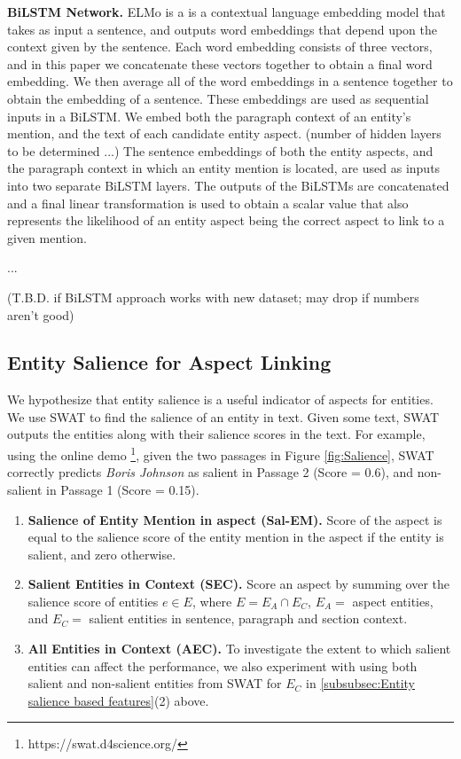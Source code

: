 \textbf{BiLSTM Network. } 
ELMo is a \cite{elmo} is a contextual language embedding model that takes as input a sentence, and outputs word embeddings that depend upon the context given by the sentence. Each word embedding consists of three vectors, and in this paper we concatenate these vectors together to obtain a final word embedding. We then average all of the word embeddings in a sentence together to obtain the embedding of a sentence. These embeddings are used as sequential inputs in a BiLSTM. We embed both the paragraph context of an entity's mention, and the text of each candidate entity aspect. (number of hidden layers to be determined ...)
The sentence embeddings of both the entity aspects, and the paragraph context in which an entity mention is located, are used as inputs into two separate BiLSTM layers. The outputs of the BiLSTMs are concatenated and a final linear transformation is used to obtain a scalar value that also represents the likelihood of an entity aspect being the correct aspect to link to a given mention.
 
...
 
 (T.B.D. if BiLSTM approach works with new dataset; may drop if numbers aren't good)
 


\subsection{Entity Salience for Aspect Linking}
\label{subsec:Entity Salience for Aspect Linking}


We hypothesize that entity salience is a useful indicator of aspects for entities. We use SWAT \cite{swat}  to find the salience of an entity in text. Given some text, SWAT outputs the entities along with their salience scores in the text. For example, using the online demo \footnote{https://swat.d4science.org/}, given the two passages in Figure \ref{fig:Salience}, SWAT correctly predicts \textit{Boris Johnson} as salient in Passage 2 (Score = 0.6), and non-salient in Passage 1 (Score = 0.15). 

\begin{enumerate}
    \item \textbf{Salience of Entity Mention in aspect (Sal-EM).} Score of the aspect is equal to the salience score of the entity mention in the aspect if the entity is salient, and zero otherwise.
    
    \item \textbf{Salient Entities in Context (SEC).} Score an aspect by summing over the salience score of entities $e \in E$, where $E = E_A \cap E_C$, $E_A =$ aspect entities, and $E_C =$ salient entities in sentence, paragraph and section context.
    
    \item \textbf{All Entities in Context (AEC).} 
    To investigate the extent to which salient entities can affect the performance, we also experiment with using both salient and non-salient entities from SWAT for $E_C$ in \ref{subsubsec:Entity salience based features}(2) above. 
\end{enumerate}


